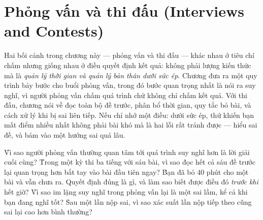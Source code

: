 \documentclass[../../algorithm.tex]{subfiles}
\begin{document}
\chapter{Phỏng vấn và thi đấu (Interviews and Contests)}

\begin{tomtat}
Hai bối cảnh trong chương này --- phỏng vấn và thi đấu --- khác nhau ở tiêu chí chấm nhưng giống nhau ở điều quyết định kết quả: không phải lượng kiến thức mà là \emph{quản lý thời gian và quản lý bản thân dưới sức ép}. Chương đưa ra một quy trình bảy bước cho buổi phỏng vấn, trong đó bước quan trọng nhất là nói ra suy nghĩ, vì người phỏng vấn chấm quá trình chứ không chỉ chấm kết quả. Với thi đấu, chương nói về đọc toàn bộ đề trước, phân bổ thời gian, quy tắc bỏ bài, và cách xử lý khi bị sai liên tiếp. Nếu chỉ nhớ một điều: dưới sức ép, thứ khiến bạn mất điểm nhiều nhất không phải bài khó mà là hai lỗi rất tránh được --- hiểu sai đề, và bám vào một hướng sai quá lâu.
\end{tomtat}

\begin{nentang}
\end{nentang}

\begin{khoigoi}
\h{Vì sao người phỏng vấn thường quan tâm tới quá trình suy nghĩ hơn là lời giải cuối cùng?}
\h{Trong một kỳ thi ba tiếng với sáu bài, vì sao đọc hết cả sáu đề trước lại quan trọng hơn bắt tay vào bài đầu tiên ngay?}
\h{Bạn đã bỏ 40 phút cho một bài và vẫn chưa ra. Quyết định đúng là gì, và làm sao biết được điều đó \emph{trước khi} hết giờ?}
\h{Vì sao im lặng suy nghĩ trong phỏng vấn lại là một sai lầm, kể cả khi bạn đang nghĩ tốt?}
\h{Sau một lần nộp sai, vì sao xác suất lần nộp tiếp theo cũng sai lại cao hơn bình thường?}
\end{khoigoi}
\end{document}
